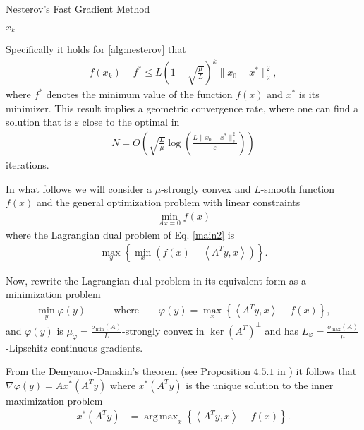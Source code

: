\documentclass[final]{siamart1116}
\DeclareMathOperator*{\argmax}{arg\,max}
\numberwithin{theorem}{section}
\begin{document}
	\begin{algorithm}
		\caption{Nesterov's Fast Gradient Method}
		\label{alg:nesterov}
		\begin{algorithmic}[1]
			\ENDWHILE
			\RETURN $x_k$
		\end{algorithmic}
	\end{algorithm}
	
	Specifically it holds for \cref{alg:nesterov} that 
	\begin{align*}
	f(x_k) - f^* \leq L\left( 1- \sqrt{\frac{\mu}{L}} \right)^k\|x_0 - x^*\|_2^2, 
	\end{align*}
	where $f^*$ denotes the minimum value of the function $f(x)$ and $x^*$ is its minimizer. This result implies a geometric convergence rate, where one can find a solution that is $\varepsilon$ close to the optimal in 
	\begin{align}\label{rate_nest}
	N = O\left(\sqrt{\frac{L}{\mu}} \log \left( \frac{L\|x_0 -x^*\|^2_2}{\varepsilon} \right) \right)
	\end{align}
	iterations.
	
	In what follows we will consider a $\mu$-strongly convex and $L$-smooth function $f(x)$ and the general optimization problem with linear constraints
	\begin{align}\label{main2}
	\min_{Ax=0} f(x)
	\end{align} 
	where the Lagrangian dual problem of Eq. \eqref{main2} is
	\begin{align*}
	\max_y \left\lbrace \min_{{x}} \left( f(x) - \left\langle A^Ty,x \right\rangle \right) \right\rbrace.
	\end{align*}
	
	Now, rewrite the Lagrangian dual problem in its equivalent form as a minimization problem
	\begin{align}\label{dual_problem22}
	\min_y \varphi(y) & \qquad \text{where} \qquad \varphi(y) = \max_x \left\lbrace \left\langle A^Ty,x \right\rangle -f(x) \right\rbrace,
	\end{align}
	and $\varphi(y)$ is $\mu_\varphi = \frac{\sigma_{\min}(A)}{L}$-strongly convex in $\ker(A^T)^{\perp}$ and has $L_\varphi = \frac{\sigma_{\max}(A)}{\mu}$-Lipschitz continuous gradients.
	
	From the Demyanov-Danskin's theorem (see Proposition $4.5.1$ in \cite{Bertsekas2003})  it follows that \mbox{$\nabla \varphi(y) = Ax^*(A^Ty) $} where $x^*(A^Ty)$ is the unique solution to the inner maximization problem  
	\begin{align*}
	x^*(A^Ty) & = \argmax_x \left\lbrace \left\langle A^Ty,x \right\rangle -f(x) \right\rbrace.
	\end{align*}
	
\end{document}
